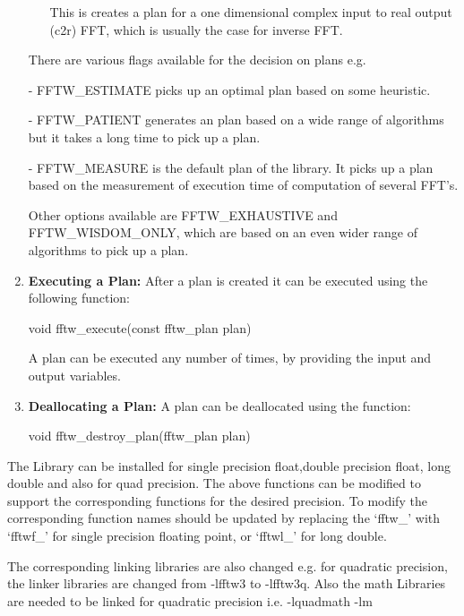 \begin{enumerate}
\begin{itemize}
This is creates a plan for a one dimensional complex input to real output (c2r) FFT, which is usually the case for inverse FFT.
\end{itemize}
There are various flags available for the decision on plans e.g. 

- FFTW\_ESTIMATE picks up an optimal plan based on some heuristic.

- FFTW\_PATIENT generates an plan based on a wide range of algorithms but it takes a long time to pick up a plan.

- FFTW\_MEASURE is the default plan of the library. It picks up a plan based on the measurement of execution time of computation of several FFT's.

Other options available are FFTW\_EXHAUSTIVE and FFTW\_WISDOM\_ONLY, which are based on an even wider range of algorithms to pick up a plan. 
\item
\textbf{Executing a Plan:} After a plan is created it can be executed using the following function:

void fftw\_execute(const fftw\_plan plan)

A plan can be executed any number of times, by providing the input and output variables.
\item
\textbf{Deallocating a Plan:} A plan can be deallocated using the function:

void fftw\_destroy\_plan(fftw\_plan plan)

 \end{enumerate}
 The Library can be installed for single precision float,double precision float, long double and also for quad precision. The above functions can be modified to support the corresponding functions for the desired precision. To modify the corresponding function names should be updated by replacing the ‘fftw\_’ with ‘fftwf\_’ for single precision floating point, or ‘fftwl\_’ for long double.
 
 \noindent The corresponding linking libraries are also changed e.g. for quadratic precision, the linker libraries are changed from -lfftw3 to -lfftw3q. Also the math Libraries are needed to be linked for quadratic precision i.e. -lquadmath -lm 
